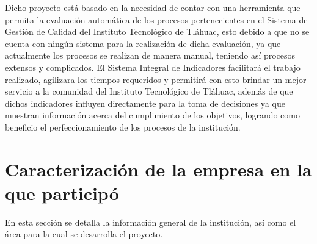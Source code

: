 Dicho proyecto est\'a basado en la necesidad de contar con una herramienta que permita la evaluaci\'on autom\'atica de los procesos pertenecientes en el Sistema de Gesti\'on de Calidad del Instituto Tecnol\'ogico de Tl\'ahuac, esto debido a que no se cuenta con ning\'un sistema para la realizaci\'on de dicha evaluaci\'on, ya que actualmente los procesos se realizan de manera manual, teniendo as\'i procesos extensos y complicados.
El Sistema Integral de Indicadores facilitar\'a el trabajo realizado, agilizara los tiempos requeridos y permitir\'a con esto brindar un mejor servicio a la comunidad del Instituto Tecnol\'ogico de Tl\'ahuac, adem\'as de que dichos indicadores influyen directamente para la toma de decisiones ya que muestran informaci\'on acerca del cumplimiento de los objetivos, logrando como beneficio el perfeccionamiento de los procesos de la instituci\'on.


\section{Caracterizaci\'on de la empresa en la que particip\'o}
En esta secci\'on se detalla la informaci\'on general de la instituci\'on, as\'i como el \'area para la cual se desarrolla el proyecto.

